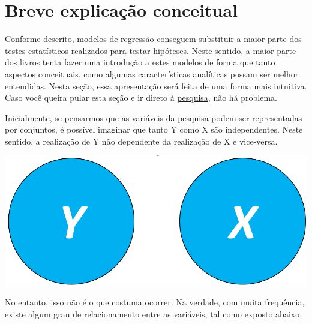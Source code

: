 \documentclass[
]{book}
\begin{document}
\hypertarget{breve-explicauxe7uxe3o-conceitual}{%
\section{Breve explicação conceitual}\label{breve-explicauxe7uxe3o-conceitual}}

Conforme descrito, modelos de regressão conseguem substituir a maior parte dos testes estatísticos realizados para testar hipóteses. Neste sentido, a maior parte dos livros tenta fazer uma introdução a estes modelos de forma que tanto aspectos conceituais, como algumas características analíticas possam ser melhor entendidas. Nesta seção, essa apresentação será feita de uma forma mais intuitiva. Caso você queira pular esta seção e ir direto à \protect\hyperlink{ux5cux23pesquisa}{pesquisa}, não há problema.

Inicialmente, se pensarmos que as variáveis da pesquisa podem ser representadas por conjuntos, é possível imaginar que tanto Y como X são independentes. Neste sentido, a realização de Y não dependente da realização de X e vice-versa.

\includegraphics{./img/cap_reg_xy.png}

No entanto, isso não é o que costuma ocorrer. Na verdade, com muita frequência, existe algum grau de relacionamento entre as variáveis, tal como exposto abaixo.
\end{document}
